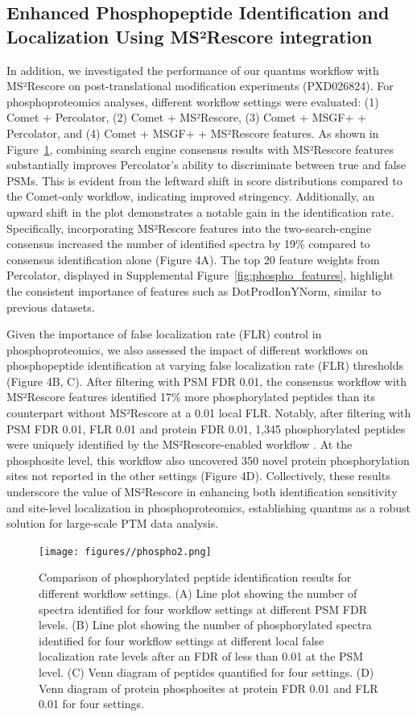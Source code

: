 \documentclass[12pt]{article}
\begin{document}
\subsection{Enhanced Phosphopeptide Identification and Localization Using MS²Rescore integration}
In addition, we investigated the performance of our quantms workflow with MS²Rescore on post-translational modification experiments (PXD026824). For phosphoproteomics analyses, different workflow settings were evaluated: (1) Comet + Percolator, (2) Comet + MS²Rescore, (3) Comet + MSGF+ + Percolator, and (4) Comet + MSGF+ + MS²Rescore features. As shown in Figure~\ref{fig:PXD026824_ms2rescore}, combining search engine consensus results with MS²Rescore features substantially improves Percolator's ability to discriminate between true and false PSMs. This is evident from the leftward shift in score distributions compared to the Comet-only workflow, indicating improved stringency. Additionally, an upward shift in the plot demonstrates a notable gain in the identification rate. Specifically, incorporating MS²Rescore features into the two-search-engine consensus increased the number of identified spectra by 19\% compared to consensus identification alone (Figure 4A). The top 20 feature weights from Percolator, displayed in Supplemental Figure~\ref{fig:phospho_features}, highlight the consistent importance of features such as DotProdIonYNorm, similar to previous datasets.

Given the importance of false localization rate (FLR) control in phosphoproteomics, we also assessed the impact of different workflows on phosphopeptide identification at varying false localization rate (FLR) thresholds (Figure 4B, C). After filtering with PSM FDR 0.01, the consensus workflow with MS²Rescore features identified 17\% more phosphorylated peptides than its counterpart without MS²Rescore at a 0.01 local FLR. Notably, after filtering with PSM FDR 0.01, FLR 0.01 and protein FDR 0.01, 1,345 phosphorylated peptides were uniquely identified by the MS²Rescore-enabled workflow . At the phosphosite level, this workflow also uncovered 350 novel protein phosphorylation sites not reported in the other settings (Figure 4D). Collectively, these results underscore the value of MS²Rescore in enhancing both identification sensitivity and site-level localization in phosphoproteomics, establishing quantms as a robust solution for large-scale PTM data analysis.

\begin{figure}[ht!]
	\centering
	\texttt{[image: figures//phospho2.png]}
	\caption{Comparison of phosphorylated peptide identification results for different workflow settings. (A) Line plot showing the number of spectra identified for four workflow settings at different PSM FDR levels. (B) Line plot showing the number of phosphorylated spectra identified for four workflow settings at different local false localization rate levels after an FDR of less than 0.01 at the PSM level. (C) Venn diagram of peptides quantified for four settings. (D) Venn diagram of protein phosphosites at protein FDR 0.01 and FLR 0.01 for four settings.} %
	\label{fig:PXD026824_ms2rescore}
\end{figure}
\end{document}
